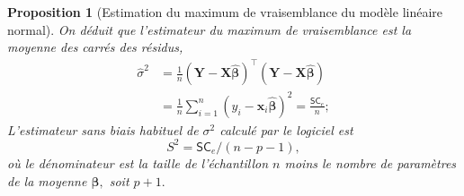 \documentclass[
  11pt,
  letterpaper,
]{scrbook}
\theoremstyle{plain}
\newtheorem{proposition}{Proposition}[chapter]
\theoremstyle{plain}
\theoremstyle{definition}
\theoremstyle{definition}
\theoremstyle{remark}
\begin{document}
\begin{proposition}[Estimation du maximum de vraisemblance du modèle
linéaire
normal]
On déduit que l'estimateur du maximum de vraisemblance est la moyenne
des carrés des résidus, \begin{align*}
\widehat{\sigma}^2&=\frac{1}{n}(\boldsymbol{Y}-\mathbf{X}\hat{\boldsymbol{\beta}})^\top(\boldsymbol{Y}-\mathbf{X}\hat{\boldsymbol{\beta}})\\&= \frac{1}{n} \sum_{i=1}^n (y_i - \mathbf{x}_i\widehat{\boldsymbol{\beta}})^2= \frac{\mathsf{SC}_e}{n};
\end{align*} L'estimateur sans biais habituel de \(\sigma^2\) calculé
par le logiciel est \[S^2=\mathsf{SC}_e/(n-p-1),
\] où le dénominateur est la taille de l'échantillon \(n\) moins le
nombre de paramètres de la moyenne \(\boldsymbol{\beta},\) soit \(p+1.\)

\end{proposition}
\end{document}
